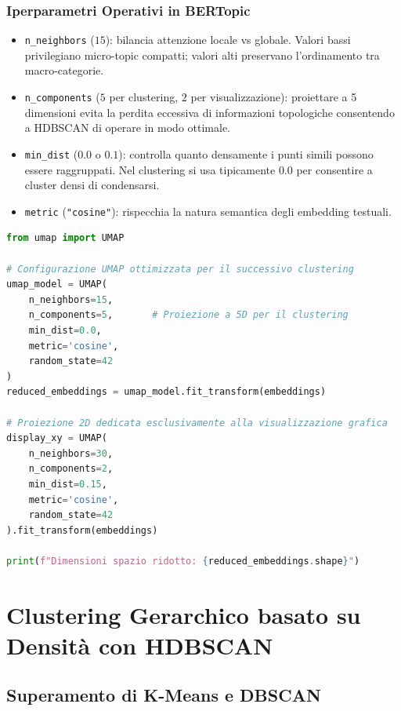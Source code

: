 \subsubsection{Iperparametri Operativi in BERTopic}
\begin{itemize}
    \item \texttt{n\_neighbors} ($15$): bilancia attenzione locale vs globale. Valori bassi privilegiano micro-topic compatti; valori alti preservano l'ordinamento tra macro-categorie.
    \item \texttt{n\_components} ($5$ per clustering, $2$ per visualizzazione): proiettare a 5 dimensioni evita la perdita eccessiva di informazioni topologiche consentendo a HDBSCAN di operare in modo ottimale.
    \item \texttt{min\_dist} ($0.0$ o $0.1$): controlla quanto densamente i punti simili possono essere raggruppati. Nel clustering si usa tipicamente $0.0$ per consentire a cluster densi di condensarsi.
    \item \texttt{metric} (\texttt{"cosine"}): rispecchia la natura semantica degli embedding testuali.
\end{itemize}

\begin{lstlisting}[language=Python, caption={Riduzione della dimensionalità con UMAP su vettori di embedding.}]
from umap import UMAP

# Configurazione UMAP ottimizzata per il successivo clustering
umap_model = UMAP(
    n_neighbors=15,
    n_components=5,       # Proiezione a 5D per il clustering
    min_dist=0.0,
    metric='cosine',
    random_state=42
)
reduced_embeddings = umap_model.fit_transform(embeddings)

# Proiezione 2D dedicata esclusivamente alla visualizzazione grafica
display_xy = UMAP(
    n_neighbors=30, 
    n_components=2, 
    min_dist=0.15, 
    metric='cosine', 
    random_state=42
).fit_transform(embeddings)

print(f"Dimensioni spazio ridotto: {reduced_embeddings.shape}")
\end{lstlisting}

\FloatBarrier
\section{Clustering Gerarchico basato su Densità con HDBSCAN}
\label{sec:lab-hdbscan-clustering}

\FloatBarrier
\subsection{Superamento di K-Means e DBSCAN}
\label{subsec:lab-why-hdbscan}

